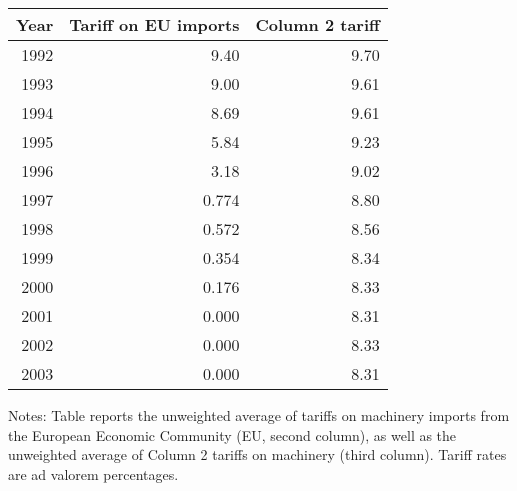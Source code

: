 \begin{tabular}{rrr}
\hline \hline
 Year &  Tariff on EU imports &  Column 2 tariff \\
\hline


1992 & 9.40 & 9.70\\

1993 & 9.00 & 9.61\\

1994 & 8.69 & 9.61\\

1995 & 5.84 & 9.23\\

1996 & 3.18 & 9.02\\

1997 & 0.774 & 8.80\\

1998 & 0.572 & 8.56\\

1999 & 0.354 & 8.34\\

2000 & 0.176 & 8.33\\

2001 & 0.000 & 8.31\\

2002 & 0.000 & 8.33\\

2003 & 0.000 & 8.31\\

\hline \hline
\end{tabular}
\begin{tablenotes}
\item \footnotesize Notes: Table reports the unweighted average of tariffs on machinery imports from the European Economic Community (EU, second column), as well as the unweighted average of Column 2 tariffs on machinery (third column). Tariff rates are ad valorem percentages.
\end{tablenotes}